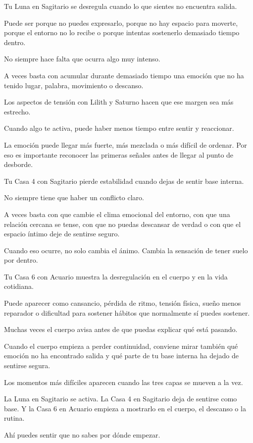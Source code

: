 \documentclass[11pt,a4paper]{article}
\begin{document}
Tu Luna en Sagitario se desregula cuando lo que sientes no encuentra salida.

Puede ser porque no puedes expresarlo, porque no hay espacio para moverte, porque el entorno no lo recibe o porque intentas sostenerlo demasiado tiempo dentro.

No siempre hace falta que ocurra algo muy intenso.

A veces basta con acumular durante demasiado tiempo una emoción que no ha tenido lugar, palabra, movimiento o descanso.

Los aspectos de tensión con Lilith y Saturno hacen que ese margen sea más estrecho.

Cuando algo te activa, puede haber menos tiempo entre sentir y reaccionar.

La emoción puede llegar más fuerte, más mezclada o más difícil de ordenar. Por eso es importante reconocer las primeras señales antes de llegar al punto de desborde.

Tu Casa 4 con Sagitario pierde estabilidad cuando dejas de sentir base interna.

No siempre tiene que haber un conflicto claro.

A veces basta con que cambie el clima emocional del entorno, con que una relación cercana se tense, con que no puedas descansar de verdad o con que el espacio íntimo deje de sentirse seguro.

Cuando eso ocurre, no solo cambia el ánimo. Cambia la sensación de tener suelo por dentro.

Tu Casa 6 con Acuario muestra la desregulación en el cuerpo y en la vida cotidiana.

Puede aparecer como cansancio, pérdida de ritmo, tensión física, sueño menos reparador o dificultad para sostener hábitos que normalmente sí puedes sostener.

Muchas veces el cuerpo avisa antes de que puedas explicar qué está pasando.

Cuando el cuerpo empieza a perder continuidad, conviene mirar también qué emoción no ha encontrado salida y qué parte de tu base interna ha dejado de sentirse segura.

Los momentos más difíciles aparecen cuando las tres capas se mueven a la vez.

La Luna en Sagitario se activa.
La Casa 4 en Sagitario deja de sentirse como base.
Y la Casa 6 en Acuario empieza a mostrarlo en el cuerpo, el descanso o la rutina.

Ahí puedes sentir que no sabes por dónde empezar.
\end{document}
